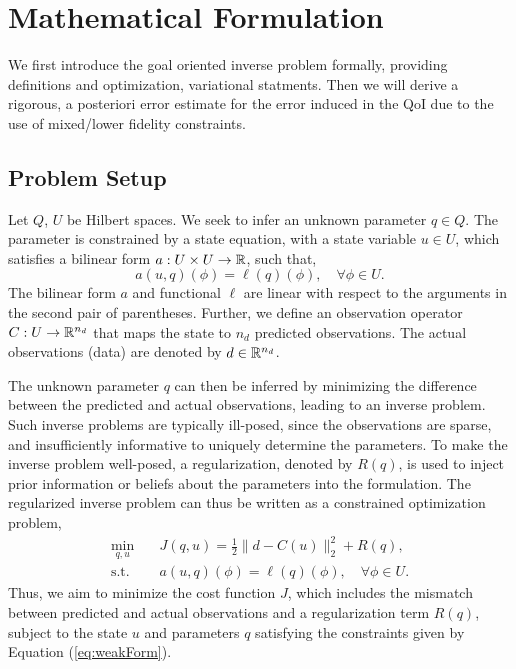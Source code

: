 \section{Mathematical Formulation}\label{sect:form}
%
We first introduce the goal oriented inverse problem formally, providing definitions and optimization, variational statments. Then we will derive a rigorous, a posteriori error estimate for the error induced in the QoI due to the use of mixed/lower fidelity constraints.

\subsection{Problem Setup}  \label{sec:setup}
%
Let $Q$, $U$ be Hilbert spaces. We seek to infer an unknown parameter $q \in Q$. The parameter is constrained by a state equation, with a state variable $u \in U$, which satisfies a bilinear form $a:U \times U \to {\mathbb{R}}$, such that,
%
\begin{equation}
\label{eq:weakForm}
a(u,q)(\phi)=\ell(q)(\phi),\quad\forall\phi\in U.
\end{equation}
%
The bilinear form $a$ and functional $\ell$ are linear with respect to the arguments in the second pair of parentheses. Further, we define an observation operator $C:U\to{\mathbb{R}}^{n_d}$ that maps the state to $n_d$ predicted observations. The actual observations (data) are denoted by $d\in{\mathbb{R}}^{n_d}$.

The unknown parameter $q$ can then be inferred by minimizing the difference between the predicted and actual observations, leading to an inverse problem. Such inverse problems are typically ill-posed, since the observations are sparse, and insufficiently informative to uniquely determine the parameters. To make the inverse problem well-posed, a regularization, denoted by $R(q)$, is used to inject prior information or beliefs about the parameters into the formulation. The regularized inverse problem can thus be written as a constrained optimization problem,
%
\begin{subequations}
\label{eq:invOpt}
\begin{align}
\min\limits_{q,u} & \quad J(q,u)=\frac{1}{2}\|d-C(u)\|_2^2 + R(q), \label{eq:invOpt_obj} \\
\textrm{s.t. }& \quad a(u,q)(\phi)=\ell(q)(\phi),\quad\forall\phi\in U. \label{eq:invOpt_cons}
\end{align}
\end{subequations}
%
Thus, we aim to minimize the cost function $J$, which includes the mismatch between predicted and actual observations and a regularization term $R(q)$, subject to the state $u$ and parameters $q$ satisfying the constraints given by Equation (\ref{eq:weakForm}).

